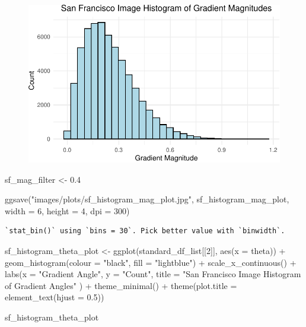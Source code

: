 \documentclass[
  letterpaper,
  DIV=11,
  numbers=noendperiod]{scrreprt}
\newenvironment{Shaded}{\begin{snugshade}}{\end{snugshade}}
\newcommand{\AttributeTok}[1]{\textcolor[rgb]{0.40,0.45,0.13}{#1}}
\newcommand{\DecValTok}[1]{\textcolor[rgb]{0.68,0.00,0.00}{#1}}
\newcommand{\FloatTok}[1]{\textcolor[rgb]{0.68,0.00,0.00}{#1}}
\newcommand{\FunctionTok}[1]{\textcolor[rgb]{0.28,0.35,0.67}{#1}}
\newcommand{\NormalTok}[1]{\textcolor[rgb]{0.00,0.23,0.31}{#1}}
\newcommand{\OtherTok}[1]{\textcolor[rgb]{0.00,0.23,0.31}{#1}}
\newcommand{\SpecialCharTok}[1]{\textcolor[rgb]{0.37,0.37,0.37}{#1}}
\newcommand{\StringTok}[1]{\textcolor[rgb]{0.13,0.47,0.30}{#1}}
\begin{document}
\begin{figure}[H]

{\centering \includegraphics{results_files/figure-pdf/unnamed-chunk-10-1.pdf}

}

\end{figure}

\begin{Shaded}
\begin{Highlighting}[]
\NormalTok{sf\_mag\_filter }\OtherTok{\textless{}{-}} \FloatTok{0.4}

\FunctionTok{ggsave}\NormalTok{(}\StringTok{"images/plots/sf\_histogram\_mag\_plot.jpg"}\NormalTok{, sf\_histogram\_mag\_plot, }\AttributeTok{width =} \DecValTok{6}\NormalTok{, }\AttributeTok{height =} \DecValTok{4}\NormalTok{, }\AttributeTok{dpi =} \DecValTok{300}\NormalTok{)}
\end{Highlighting}
\end{Shaded}

\begin{verbatim}
`stat_bin()` using `bins = 30`. Pick better value with `binwidth`.
\end{verbatim}

\begin{Shaded}
\begin{Highlighting}[]
\NormalTok{sf\_histogram\_theta\_plot }\OtherTok{\textless{}{-}}
  \FunctionTok{ggplot}\NormalTok{(standard\_df\_list[[}\DecValTok{2}\NormalTok{]], }\FunctionTok{aes}\NormalTok{(}\AttributeTok{x =}\NormalTok{ theta)) }\SpecialCharTok{+}
  \FunctionTok{geom\_histogram}\NormalTok{(}\AttributeTok{colour =} \StringTok{"black"}\NormalTok{, }\AttributeTok{fill =} \StringTok{"lightblue"}\NormalTok{) }\SpecialCharTok{+}
  \FunctionTok{scale\_x\_continuous}\NormalTok{() }\SpecialCharTok{+} 
  \FunctionTok{labs}\NormalTok{(}\AttributeTok{x =} \StringTok{"Gradient Angle"}\NormalTok{, }
       \AttributeTok{y =} \StringTok{"Count"}\NormalTok{, }
       \AttributeTok{title =} \StringTok{"San Francisco Image Histogram of Gradient Angles"}
\NormalTok{       ) }\SpecialCharTok{+}
  \FunctionTok{theme\_minimal}\NormalTok{() }\SpecialCharTok{+}
  \FunctionTok{theme}\NormalTok{(}\AttributeTok{plot.title =} \FunctionTok{element\_text}\NormalTok{(}\AttributeTok{hjust =} \FloatTok{0.5}\NormalTok{))}

\NormalTok{sf\_histogram\_theta\_plot}
\end{Highlighting}
\end{Shaded}
\end{document}
